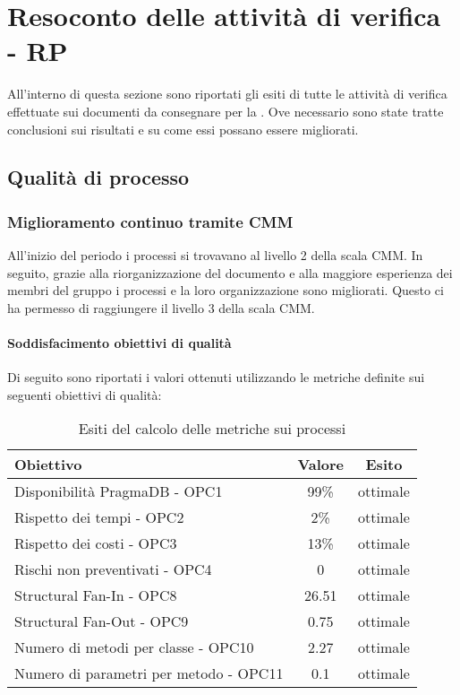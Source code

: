 \documentclass[PdQ.tex]{subfiles}
\begin{document}
\section{Resoconto delle attività di verifica - RP}
All'interno di questa sezione sono riportati gli esiti di tutte le attività di verifica effettuate sui documenti da consegnare per la \RP{}. Ove necessario sono state tratte conclusioni sui risultati e su come essi possano essere migliorati.

\subsection{Qualità di processo}
		\subsubsection{Miglioramento continuo tramite CMM}
	
		All'inizio del periodo i processi si trovavano al livello 2 della scala CMM. In seguito, grazie alla riorganizzazione del documento \NPdocRP{} e alla maggiore esperienza dei membri del gruppo i processi e la loro organizzazione sono migliorati. Questo ci ha permesso di raggiungere il livello 3 della scala CMM. 

		\paragraph{Soddisfacimento obiettivi di qualità}
			Di seguito sono riportati i valori ottenuti utilizzando le metriche definite sui seguenti obiettivi di qualità:
			\begin{table}[h]
				\centering
				\begin{tabular}{l c c}
					\hline
					\rule[-0.3cm]{0cm}{0.8cm}
					\textbf{Obiettivo} & \textbf{Valore} & \textbf{Esito} \\
					\hline
					\rule[0cm]{0cm}{0.4cm}
					Disponibilità PragmaDB - OPC1 & 99\% & ottimale \\
					\rule[0cm]{0cm}{0.4cm}
					Rispetto dei tempi - OPC2 & 2\% & ottimale \\
					\rule[0cm]{0cm}{0.4cm}
					Rispetto dei costi - OPC3 & 13\% & ottimale\\ 
					\rule[0cm]{0cm}{0.4cm}
					Rischi non preventivati - OPC4 & 0 & ottimale\\ 
					\rule[0cm]{0cm}{0.4cm}
					Structural Fan-In - OPC8 & 26.51 & ottimale\\ 
					\rule[0cm]{0cm}{0.4cm}
					Structural Fan-Out - OPC9 & 0.75 & ottimale\\ 
					\rule[0cm]{0cm}{0.4cm}
					Numero di metodi per classe - OPC10 & 2.27 & ottimale\\ 
					\rule[0cm]{0cm}{0.4cm}
					Numero di parametri per metodo - OPC11 & 0.1 & ottimale\\ 
					\hline
				\end{tabular}
				\caption{Esiti del calcolo delle metriche sui processi}
			\end{table}
		
\end{document}
